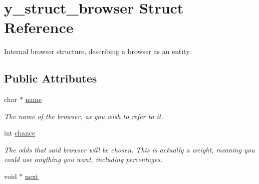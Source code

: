\hypertarget{structy__struct__browser}{\section{y\-\_\-struct\-\_\-browser Struct Reference}
\label{structy__struct__browser}
}


Internal browser structure, describing a browser as an entity.  


\subsection*{Public Attributes}
\begin{DoxyCompactItemize}
\item 
\hypertarget{structy__struct__browser_a6b647f8ab7aa5df89ce78206f1381df7}{char $\ast$ \hyperlink{structy__struct__browser_a6b647f8ab7aa5df89ce78206f1381df7}{name}}\label{structy__struct__browser_a6b647f8ab7aa5df89ce78206f1381df7}

\begin{DoxyCompactList}\small\item\em The name of the browser, as you wish to refer to it. \end{DoxyCompactList}\item 
\hypertarget{structy__struct__browser_ad202f290807b9edc15b5af071e0c3314}{int \hyperlink{structy__struct__browser_ad202f290807b9edc15b5af071e0c3314}{chance}}\label{structy__struct__browser_ad202f290807b9edc15b5af071e0c3314}

\begin{DoxyCompactList}\small\item\em The odds that said browser will be chosen. This is actually a weight, meaning you could use anything you want, including percentages. \end{DoxyCompactList}\item 
\hypertarget{structy__struct__browser_afd29e8bc06a45377428abe3cb1f25056}{void $\ast$ \hyperlink{structy__struct__browser_afd29e8bc06a45377428abe3cb1f25056}{next}}\label{structy__struct__browser_afd29e8bc06a45377428abe3cb1f25056}


\end{DoxyCompactItemize}
